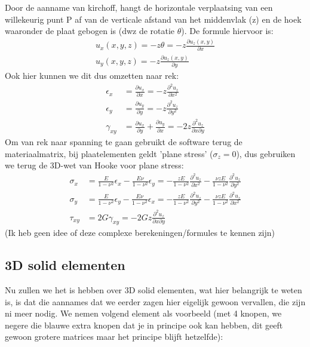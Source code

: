 \documentclass[a4paper,11pt,twoside]{report}
\begin{document}
Door de aanname van kirchoff, hangt de horizontale verplaatsing van een willekeurig punt P af van de
verticale afstand van het middenvlak (z) en de hoek waaronder de plaat gebogen is (dwz de rotatie
$\theta$). De formule hiervoor is:
\begin{align*}
    {u}_x(x, y, z) = -z \theta = -z \frac{\partial u_z(x, y)}{\partial x} \\
    {u}_y(x, y, z) = -z \frac{\partial u_z(x, y)}{\partial y}
\end{align*}
Ook hier kunnen we dit dus omzetten naar rek:
\begin{align*}
    \epsilon_x  & = \frac{\partial u_x}{\partial x} = -z \frac{\partial^2 u_z}{\partial x^2}                                             \\
    \epsilon_y  & = \frac{\partial u_y}{\partial y} = -z \frac{\partial^2 u_z}{\partial y^2}                                             \\
    \gamma_{xy} & = \frac{\partial u_x}{\partial y} + \frac{\partial u_y}{\partial x} = -2z \frac{\partial^2 u_z}{\partial x \partial y}
\end{align*}
Om van rek naar spanning te gaan gebruikt de software terug de materiaalmatrix, bij plaatelementen
geldt 'plane stress' ($\sigma_z = 0$), dus gebruiken we terug de 3D-wet van Hooke voor plane stress:
\begin{align*}
    \sigma_x  & = \frac{E}{1-\nu^2} \epsilon_x - \frac{E\nu}{1-\nu^2} \epsilon_y = -\frac{zE}{1-\nu^2}  \frac{\partial^2 u_z}{\partial x^2} -\frac{\nu zE}{1-\nu^2} \frac{\partial^2 u_z}{\partial y^2} \\
    \sigma_y  & = \frac{E}{1-\nu^2} \epsilon_y - \frac{E\nu}{1-\nu^2} \epsilon_x = -\frac{zE}{1-\nu^2}  \frac{\partial^2 u_z}{\partial y^2} -\frac{\nu zE}{1-\nu^2} \frac{\partial^2 u_z}{\partial x^2} \\
    \tau_{xy} & = 2G\gamma_{xy} = -2Gz \frac{\partial^2 u_z}{\partial x \partial y}
\end{align*}
(Ik heb geen idee of deze complexe berekeningen/formules te kennen zijn)
\subsection{3D solid elementen}
Nu zullen we het is hebben over 3D solid elementen, wat hier belangrijk te weten is, is dat die
aannames dat we eerder zagen hier eigelijk gewoon vervallen, die zijn ni meer nodig. We nemen
volgend element als voorbeeld (met 4 knopen, we negere die blauwe extra knopen dat je in principe
ook kan hebben, dit geeft gewoon grotere matrices maar het principe blijft hetzelfde):
\end{document}
